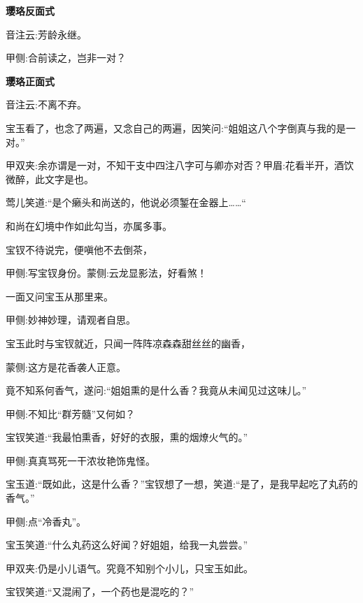 \begin{qute}

    \begin{parag}
        \textbf{璎珞反面式}
    \end{parag}


    \begin{parag}
        音注云:芳龄永继。\begin{note}甲侧:合前读之，岂非一对？\end{note}
    \end{parag}


    \begin{parag}
        \textbf{璎珞正面式}
    \end{parag}


    \begin{parag}
        音注云:不离不弃。
    \end{parag}
\end{qute}


\begin{parag}
    宝玉看了，也念了两遍，又念自己的两遍，因笑问:“姐姐这八个字倒真与我的是一对。”\begin{note}甲双夹:余亦谓是一对，不知干支中四注八字可与卿亦对否？甲眉:花看半开，酒饮微醉，此文字是也。\end{note}莺儿笑道:“是个癞头和尚送的，他说必须錾在金器上……“\begin{note}和尚在幻境中作如此勾当，亦属多事。\end{note}宝钗不待说完，便嗔他不去倒茶，\begin{note}甲侧:写宝钗身份。蒙侧:云龙显影法，好看煞！\end{note}一面又问宝玉从那里来。\begin{note}甲侧:妙神妙理，请观者自思。\end{note}
\end{parag}


\begin{parag}
    宝玉此时与宝钗就近，只闻一阵阵凉森森甜丝丝的幽香，\begin{note}蒙侧:这方是花香袭人正意。\end{note}竟不知系何香气，遂问:“姐姐熏的是什么香？我竟从未闻见过这味儿。”\begin{note}甲侧:不知比“群芳髓”又何如？\end{note}宝钗笑道:“我最怕熏香，好好的衣服，熏的烟燎火气的。”\begin{note}甲侧:真真骂死一干浓妆艳饰鬼怪。\end{note}宝玉道:“既如此，这是什么香？”宝钗想了一想，笑道:“是了，是我早起吃了丸药的香气。”\begin{note}甲侧:点“冷香丸”。\end{note}宝玉笑道:“什么丸药这么好闻？好姐姐，给我一丸尝尝。”\begin{note}甲双夹:仍是小儿语气。究竟不知别个小儿，只宝玉如此。\end{note}宝钗笑道:“又混闹了，一个药也是混吃的？”
\end{parag}


